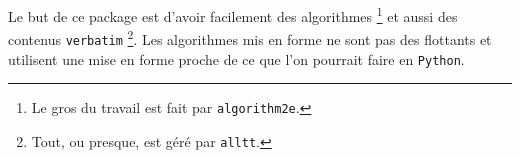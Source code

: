 Le but de ce package est d'avoir facilement des algorithmes
\footnote{
	Le gros du travail est fait par \texttt{algorithm2e}.
}
et aussi des contenus \verb+verbatim+
\footnote{
	Tout, ou presque, est géré par \texttt{alltt}.
}.
Les algorithmes mis en forme ne sont pas des flottants et utilisent une mise en forme proche de ce que l'on pourrait faire en \verb+Python+.